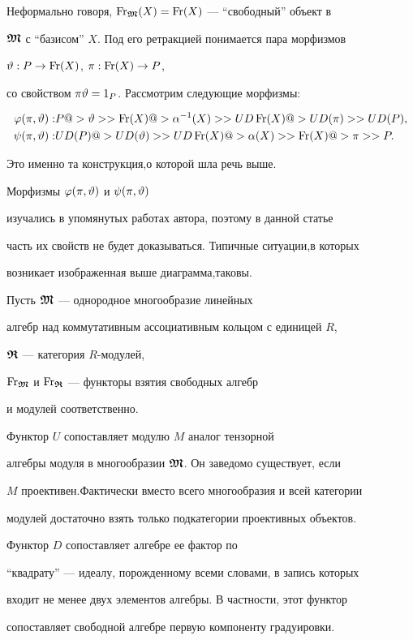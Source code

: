 Неформально говоря, $\operatorname{Fr}_{\boldsymbol{\frak M}}(X)=\operatorname{Fr}(X)$ --- ``свободный'' объект в


$\boldsymbol{\frak M}$ с ``базисом'' $X$. Под его ретракцией понимается пара морфизмов


$\vartheta : P\to \operatorname{Fr}(X)$, $\pi : \operatorname{Fr}(X)\to P$,


со свойством $\pi\vartheta=1_P$. Рассмотрим следующие морфизмы:


\begin{align*}


\f(\pi,\te):  & P @>{\te}>> \Fr(X) @>{\alpha^{-1}(X)}>> UD\Fr(X) 


@>{UD(\pi)}>> UD(P), \\


\p (\pi,\te) : & UD(P) @>{UD(\te)}>> 


UD\Fr(X) @>{\alpha(X)}>>  \Fr(X) @>{\pi}>> P.


\end{align*}


Это именно та конструкция,о которой шла речь выше.


Морфизмы $\varphi(\pi,\vartheta)$ и $\psi(\pi,\vartheta)$


изучались в упомянутых работах автора, поэтому в данной статье


часть их свойств не будет доказываться. Типичные ситуации,в которых


возникает изображенная выше диаграмма,таковы.





\begin{exam}


Пусть $\boldsymbol{\frak M}$ --- однородное многообразие линейных


алгебр над коммутативным ассоциативным кольцом с единицей $R$,


$\boldsymbol{\frak R}$ --- категория $R$-модулей,


$\operatorname{Fr}_{\boldsymbol{\frak M}}$ и $\operatorname{Fr}_{\boldsymbol{\frak R}}$ --- функторы взятия свободных алгебр


и модулей соответственно.


Функтор $U$ сопоставляет модулю $M$ аналог тензорной


алгебры модуля в многообразии $\boldsymbol{\frak M}$. Он заведомо существует, если


$M$ проективен.Фактически вместо всего многообразия и всей категории


модулей достаточно взять только подкатегории проективных объектов.


Функтор $D$ сопоставляет алгебре ее фактор по


``квадрату'' --- идеалу, порожденному всеми словами, в запись которых


входит не менее двух элементов алгебры. В частности, этот функтор


сопоставляет свободной алгебре первую компоненту градуировки.


\end{exam}





